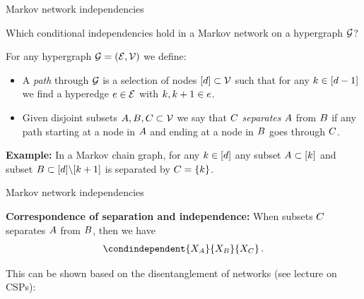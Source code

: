 \documentclass{beamer}
\begin{document}
    \begin{frame}{Markov network independencies}

        Which conditional independencies hold in a Markov network on a hypergraph $\mathcal{G}$?

        \begin{definition}
            For any hypergraph $\mathcal{G}=(\mathcal{E},\mathcal{V})$ we define:
            \begin{itemize}
                \item A \emph{path} through $\mathcal{G}$ is a selection of nodes $[d]\subset\mathcal{V}$ such that for any $k\in[d-1]$ we find a hyperedge $e\in\mathcal{E}$ with $k,k+1\in e$.
                \item Given disjoint subsets $A,B,C\subset\mathcal{V}$ we say that $C$ \emph{separates} $A$ from $B$ if any path starting at a node in $A$ and ending at a node in $B$ goes through $C$.
            \end{itemize}
        \end{definition}

            {\bf Example:} In a Markov chain graph, for any $k\in[d]$ any subset $A\subset[k]$ and subset $B\subset[d]\backslash[k+1]$ is separated by $C=\{k\}$.
    \end{frame}

    \begin{frame}{Markov network independencies}

        {\bf Correspondence of separation and independence:}
        When subsets $C$ separates $A$ from $B$, then we have
        \begin{align*}
            \condindependent{\catvariableof{\nodesa}}{\catvariableof{\nodesb}}{\catvariableof{\nodesc}} \, .
        \end{align*}

        This can be shown based on the disentanglement of networks (see lecture on CSPs):
        


    \end{frame}
\end{document}
